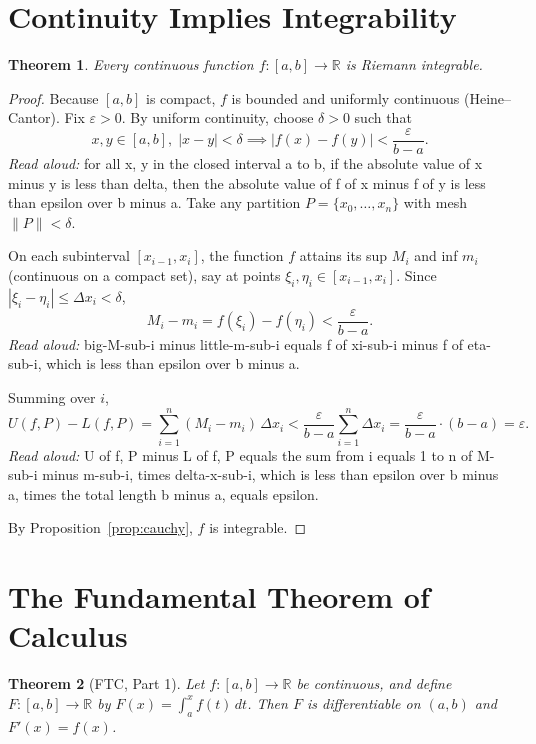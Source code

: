 \documentclass[11pt]{article}
\newtheorem{theorem}{Theorem}
\begin{document}
\section{Continuity Implies Integrability}

\begin{theorem}\label{thm:main}
Every continuous function $f : [a, b] \to \mathbb{R}$ is Riemann integrable.
\end{theorem}

\begin{proof}
Because $[a,b]$ is compact, $f$ is bounded and uniformly continuous (Heine--Cantor).
Fix $\varepsilon > 0$. By uniform continuity, choose $\delta > 0$ such that
\[ x, y \in [a,b], \; |x - y| < \delta \implies |f(x) - f(y)| < \frac{\varepsilon}{b - a}. \]
\emph{Read aloud:} for all x, y in the closed interval a to b, if the absolute value of x minus y is less than delta, then the absolute value of f of x minus f of y is less than epsilon over b minus a.
Take any partition $P = \{x_0, \dots, x_n\}$ with mesh $\|P\| < \delta$.

On each subinterval $[x_{i-1}, x_i]$, the function $f$ attains its sup $M_i$ and inf
$m_i$ (continuous on a compact set), say at points $\xi_i, \eta_i \in [x_{i-1}, x_i]$.
Since $|\xi_i - \eta_i| \le \Delta x_i < \delta$,
\[ M_i - m_i = f(\xi_i) - f(\eta_i) < \frac{\varepsilon}{b - a}. \]
\emph{Read aloud:} big-M-sub-i minus little-m-sub-i equals f of xi-sub-i minus f of eta-sub-i, which is less than epsilon over b minus a.

Summing over $i$,
\[ U(f, P) - L(f, P)
   = \sum_{i=1}^{n} (M_i - m_i)\, \Delta x_i
   < \frac{\varepsilon}{b - a} \sum_{i=1}^{n} \Delta x_i
   = \frac{\varepsilon}{b - a} \cdot (b - a)
   = \varepsilon. \]
\emph{Read aloud:} U of f, P minus L of f, P equals the sum from i equals 1 to n of M-sub-i minus m-sub-i, times delta-x-sub-i, which is less than epsilon over b minus a, times the total length b minus a, equals epsilon.

By Proposition~\ref{prop:cauchy}, $f$ is integrable.
\end{proof}

\section{The Fundamental Theorem of Calculus}

\begin{theorem}[FTC, Part 1]
Let $f : [a, b] \to \mathbb{R}$ be continuous, and define $F : [a, b] \to \mathbb{R}$ by
$F(x) = \int_a^x f(t)\,dt$. Then $F$ is differentiable on $(a, b)$ and $F'(x) = f(x)$.
\end{theorem}
\end{document}
